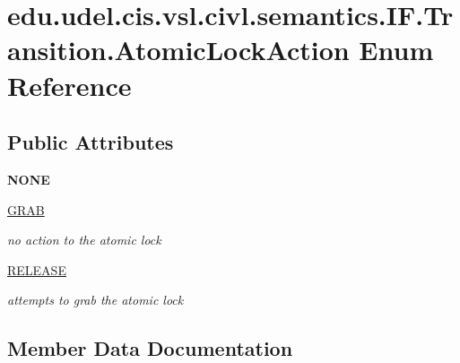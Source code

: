 \hypertarget{enumedu_1_1udel_1_1cis_1_1vsl_1_1civl_1_1semantics_1_1IF_1_1Transition_1_1AtomicLockAction}{}\section{edu.\+udel.\+cis.\+vsl.\+civl.\+semantics.\+I\+F.\+Transition.\+Atomic\+Lock\+Action Enum Reference}
\label{enumedu_1_1udel_1_1cis_1_1vsl_1_1civl_1_1semantics_1_1IF_1_1Transition_1_1AtomicLockAction}
\subsection*{Public Attributes}
\begin{DoxyCompactItemize}
\item 
\hypertarget{enumedu_1_1udel_1_1cis_1_1vsl_1_1civl_1_1semantics_1_1IF_1_1Transition_1_1AtomicLockAction_a5e36f40bae06306dbc1baab2726a9a63}{}{\bfseries N\+O\+N\+E}\label{enumedu_1_1udel_1_1cis_1_1vsl_1_1civl_1_1semantics_1_1IF_1_1Transition_1_1AtomicLockAction_a5e36f40bae06306dbc1baab2726a9a63}

\item 
\hypertarget{enumedu_1_1udel_1_1cis_1_1vsl_1_1civl_1_1semantics_1_1IF_1_1Transition_1_1AtomicLockAction_a89265ec54fc5a347b8643dc155b18142}{}\hyperlink{enumedu_1_1udel_1_1cis_1_1vsl_1_1civl_1_1semantics_1_1IF_1_1Transition_1_1AtomicLockAction_a89265ec54fc5a347b8643dc155b18142}{G\+R\+A\+B}\label{enumedu_1_1udel_1_1cis_1_1vsl_1_1civl_1_1semantics_1_1IF_1_1Transition_1_1AtomicLockAction_a89265ec54fc5a347b8643dc155b18142}

\begin{DoxyCompactList}\small\item\em no action to the atomic lock \end{DoxyCompactList}\item 
\hyperlink{enumedu_1_1udel_1_1cis_1_1vsl_1_1civl_1_1semantics_1_1IF_1_1Transition_1_1AtomicLockAction_a7b34285695881974511fa13ab99861b7}{R\+E\+L\+E\+A\+S\+E}
\begin{DoxyCompactList}\small\item\em attempts to grab the atomic lock \end{DoxyCompactList}\end{DoxyCompactItemize}


\subsection{Member Data Documentation}
\hypertarget{enumedu_1_1udel_1_1cis_1_1vsl_1_1civl_1_1semantics_1_1IF_1_1Transition_1_1AtomicLockAction_a7b34285695881974511fa13ab99861b7}{}
